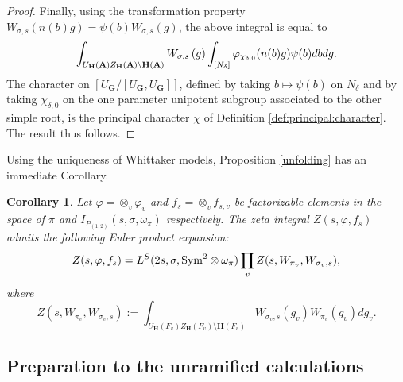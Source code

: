 \documentclass[11pt, reqno]{amsart}
\theoremstyle{plain}
\newtheorem{cor}[theorem]{Corollary}
\theoremstyle{definition}
\theoremstyle{remark}
\theoremstyle{plain}
\def\H{{H}}
\def\A{{\bf A}}
\def\G{\mathbf{G}}
\def\H{\mathbf{H}}
\begin{document}
\begin{proof}
Finally, using the transformation property $W_{\sigma,s}(n(b)g) = \psi(b) W_{\sigma,s}(g)$, the above integral is equal to 
\[\int_{U_\H(\A)Z_\H(\A)\setminus \H(\A)} W_{\sigma,s}\left(g\right)\int_{[N_{\delta}]}\varphi_{\chi_{\delta,0}}(n(b)g)\psi(b)dbdg.\]
The character on $ [U_\G /[U_\G, U_\G]]$, defined by taking $b \mapsto \psi(b)$ on $N_\delta$ and by taking $\chi_{\delta,0}$ on the one parameter unipotent subgroup associated to the other simple root, is the principal character $\chi$ of Definition \ref{def:principal:character}. The result thus follows.
\end{proof}

Using the uniqueness of Whittaker models, Proposition \ref{unfolding} has an immediate Corollary.

\begin{cor}\label{Eulerexp}
Let $\varphi = \otimes_v\varphi_v$ and $f_{s} = \otimes_v f_{s,v}$ be factorizable elements in the space of $\pi$ and $I_{P_{(1,2)}}(s,\sigma,\omega_{\pi})$ respectively. The zeta integral $Z(s,\varphi,f_s)$ admits the following Euler product expansion:
\[Z(s,\varphi,f_s) = L^S(2s, \sigma, {\rm Sym}^2 \otimes \omega_\pi) \prod_{v} Z(s,W_{\pi_v},W_{\sigma_v,s}),\]
where \[Z(s,W_{\pi_v},W_{\sigma_v,s}) := \int_{U_\H(F_v)Z_\H(F_v)\setminus \H(F_v)} W_{\sigma_v,s}\left(g_v\right)W_{\pi_v}(g_v)dg_v.\]
\end{cor}


\subsection{Preparation to the unramified calculations}
\end{document}
